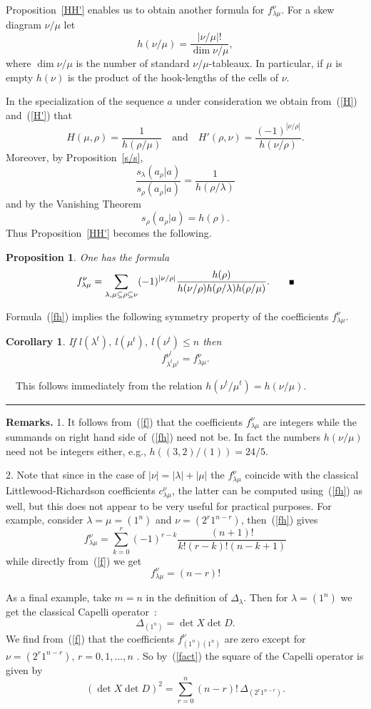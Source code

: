\documentclass[titlepage,12pt]{article}
\newcommand{\bpr}{\begin{prop}}
\newcommand{\epr}{\end{prop}}
\newcommand{\bco}{\begin{cor}}
\newcommand{\eco}{\end{cor}}
\newcommand{\beq}{\begin{equation}}
\newcommand{\eeq}{\end{equation}}
\newcommand{\qed}{\rule{1ex}{1ex}}
\newcommand{\Qed}{\rule{1ex}{1ex} \medskip}
\newcommand{\qmq}[1]{\quad\mbox{#1}\quad}
\newcommand{\0}{{\bf 0}}
\newcommand{\1}{{\bf 1}}
\newcommand{\2}{{\bf 2}}
\newcommand{\3}{{\bf 3}}
\newcommand{\4}{{\bf 4}}
\newcommand{\5}{{\bf 5}}
\newcommand{\6}{{\bf 6}}
\newcommand{\7}{{\bf 7}}
\newcommand{\8}{{\bf 8}}
\newcommand{\9}{{\bf 9}}
\newcommand{\ts}{\,}
\newcommand{\Proof}{\noindent{\bf Proof.}\ \ }
\newtheorem{prop}[thm]{Proposition}
\newtheorem{cor}[thm]{Corollary}
\begin{document}
Proposition~\ref{HH'} enables us to obtain another formula for 
$f_{\lambda\mu}^{\nu}$. For a skew diagram $\nu/\mu$ let
$$
h(\nu/\mu)=\frac{|\nu/\mu|!}{\dim \nu/\mu},
$$
where $\dim \nu/\mu$ is the number of standard $\nu/\mu$-tableaux.
In particular, if $\mu$ is empty $h(\nu)$ 
is the product of the hook-lengths of the cells of $\nu$.

In the specialization of the sequence $a$ under consideration we obtain
from~(\ref{H}) and~(\ref{H'}) that
$$
H(\mu,\rho)=\frac 1{h(\rho/\mu)} 
\qmq{and}
H'(\rho,\nu)=\frac {(-1)^{|\nu/\rho|}}{h(\nu/\rho)}.
$$
Moreover, by Proposition~\ref{s/s},
$$
\frac{s_{\lambda}(a_{\rho}|a)}{s_{\rho}(a_{\rho}|a)}=
\frac 1{h(\rho/\lambda)}
$$
and by the Vanishing Theorem
$$
s_{\rho}(a_{\rho}|a)=h(\rho).
$$
Thus Proposition~\ref{HH'} becomes the following.

\bpr
One has the formula
\beq							\label{fh}
f^{\nu}_{\lambda\mu}=\sum_{\lambda,\mu\subseteq\rho\subseteq\nu}
(-1)^{|\nu/\rho|}\frac{h(\rho)}{h(\nu/\rho)h(\rho/\lambda)h(\rho/\mu)}.
\qquad\qed
\eeq
\epr

Formula~(\ref{fh}) implies the following symmetry property of the
coefficients $f^{\nu}_{\lambda\mu}$.

\bco
If $l(\lambda^t),\ l(\mu^t),\ l(\nu^t)\le n$ then
$$
f^{\nu^t}_{\lambda^t\mu^t}=f^{\nu}_{\lambda\mu}.
$$
\eco

\Proof This follows immediately from the relation
$h(\nu^t/\mu^t)=h(\nu/\mu)$.\hfill\Qed

\noindent
{\bf Remarks.} 1. It follows from~(\ref{f}) that
the coefficients $f^{\nu}_{\lambda\mu}$ are integers while the
summands on
right hand side of~(\ref{fh}) need not be.  In fact the numbers
$h(\nu/\mu)$ need not be integers either, e.g., $h((3,2)/(1))=24/5$. 

2. Note that since in the case of $|\nu|=|\lambda|+|\mu|$ the
$f^{\nu}_{\lambda\mu}$ coincide with the classical
Littlewood-Richardson coefficients $c^{\nu}_{\lambda\mu}$,
the latter can be computed using~(\ref{fh}) as well, but this does
not appear to be very useful for practical purposes. For example,
consider $\lambda=\mu=(1^n)$ and
$\nu=(2^r1^{n-r})$, then~(\ref{fh}) gives
$$
f^{\nu}_{\lambda\mu}=\sum_{k=0}^r(-1)^{r-k}\frac{(n+1)!}{k!(r-k)!(n-k+1)}
$$
while directly from~(\ref{f}) we get
\beq						\label{fact}
f^{\nu}_{\lambda\mu}=(n-r)! 
\eeq
\medskip

As a final example, take $m=n$ in the definition of $\Delta_{\lambda}$.
Then for $\lambda=(1^n)$ we get
the classical Capelli operator~\cite{cap:otf}:
$$
\Delta_{(1^n)}=\det X\det D.
$$
We find from~(\ref{f}) that the coefficients $f^{\nu}_{(1^n)(1^n)}$
are zero except for $\nu=(2^r1^{n-r})$, $r=0,1,\dots,n$ .
So by~(\ref{fact}) the square of the Capelli operator is given by
$$
(\det X\det D)^2=\sum_{r=0}^n (n-r)!\ts
\Delta_{(2^r1^{n-r})}.
$$
\end{document}
